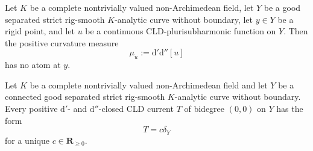 
\begin{lemma}
\label{lem:p21p3-gfc-rigid-zero-atom}
Let $K$ be a complete nontrivially valued non-Archimedean field, let
$Y$ be a good separated strict rig-smooth $K$-analytic curve without
boundary, let $y\in Y$ be a rigid point, and let $u$ be a continuous
CLD-plurisubharmonic function on $Y$.  Then the positive curvature
measure
\[
                         \mu_u:=\mathrm d'\mathrm d''[u]
\]
has no atom at $y$.
\end{lemma}

\begin{proposition}
\label{prop:p21p3-gfc-smooth-rigidity}
Let $K$ be a
complete nontrivially valued non-Archimedean field and let $Y$ be a
connected good separated strict rig-smooth $K$-analytic curve without
boundary.  Every positive $\mathrm d'$- and $\mathrm d''$-closed CLD
current $T$ of bidegree $(0,0)$ on $Y$ has the form
\begin{equation}
\label{eq:p21p3-gfc-smooth-rigidity}
                              T=c\delta_Y
\end{equation}
for a unique $c\in\mathbf R_{\geq0}$.
\end{proposition}

